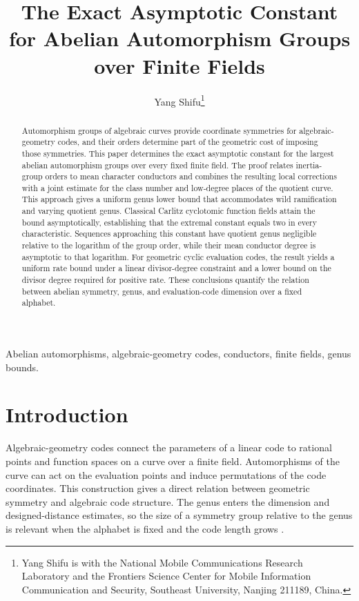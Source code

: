 \documentclass[12pt,onecolumn,draftclsnofoot,letterpaper]{IEEEtran}
\theoremstyle{remark}
\begin{document}
\title{The Exact Asymptotic Constant for Abelian Automorphism Groups over Finite Fields}
\author{Yang Shifu\thanks{Yang Shifu is with the National Mobile Communications Research Laboratory and the Frontiers Science Center for Mobile Information Communication and Security, Southeast University, Nanjing 211189, China.}}
\maketitle

\begin{abstract}
Automorphism groups of algebraic curves provide coordinate symmetries for algebraic-geometry codes, and their orders determine part of the geometric cost of imposing those symmetries. This paper determines the exact asymptotic constant for the largest abelian automorphism groups over every fixed finite field. The proof relates inertia-group orders to mean character conductors and combines the resulting local corrections with a joint estimate for the class number and low-degree places of the quotient curve. This approach gives a uniform genus lower bound that accommodates wild ramification and varying quotient genus. Classical Carlitz cyclotomic function fields attain the bound asymptotically, establishing that the extremal constant equals two in every characteristic. Sequences approaching this constant have quotient genus negligible relative to the logarithm of the group order, while their mean conductor degree is asymptotic to that logarithm. For geometric cyclic evaluation codes, the result yields a uniform rate bound under a linear divisor-degree constraint and a lower bound on the divisor degree required for positive rate. These conclusions quantify the relation between abelian symmetry, genus, and evaluation-code dimension over a fixed alphabet.
\end{abstract}
\begin{IEEEkeywords}
Abelian automorphisms, algebraic-geometry codes, conductors, finite fields, genus bounds.
\end{IEEEkeywords}

\section{Introduction}\label{sec:intro}
Algebraic-geometry codes connect the parameters of a linear code to rational points and function spaces on a curve over a finite field. Automorphisms of the curve can act on the evaluation points and induce permutations of the code coordinates. This construction gives a direct relation between geometric symmetry and algebraic code structure. The genus enters the dimension and designed-distance estimates, so the size of a symmetry group relative to the genus is relevant when the alphabet is fixed and the code length grows \cite{stichtenoth}.
\end{document}
